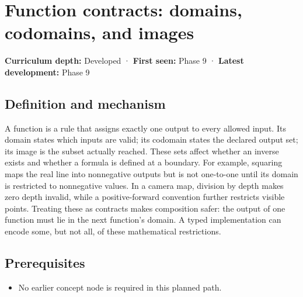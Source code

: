 \hypertarget{appendix-a59658325cd6}{}\label{referencestart:appendix-a59658325cd6}
\section{Function contracts: domains, codomains, and images}\label{appendix-a59658325cd6-function-contracts-domains-codomains-and-images}

\hypertarget{appendix-a59658325cd6-function-contracts-domains-codomains-and-images}{}

\textbf{Curriculum depth:} Developed · \textbf{First seen:} Phase 9 · \textbf{Latest development:} Phase 9

\begin{allmightroledefinition}

\subsection{Definition and mechanism}\label{appendix-a59658325cd6-definition-and-mechanism}

\hypertarget{appendix-a59658325cd6-definition-and-mechanism}{}

A function is a rule that assigns exactly one output to every allowed input. Its domain states which inputs are valid; its codomain states the declared output set; its image is the subset actually reached. These sets affect whether an inverse exists and whether a formula is defined at a boundary. For example, squaring maps the real line into nonnegative outputs but is not one-to-one until its domain is restricted to nonnegative values. In a camera map, division by depth makes zero depth invalid, while a positive-forward convention further restricts visible points. Treating these as contracts makes composition safer: the output of one function must lie in the next function's domain. A typed implementation can encode some, but not all, of these mathematical restrictions.

\end{allmightroledefinition}

\subsection{Prerequisites}\label{appendix-a59658325cd6-prerequisites}

\hypertarget{appendix-a59658325cd6-prerequisites}{}

\begin{itemize}
\tightlist
\item
  No earlier concept node is required in this planned path.
\end{itemize}

